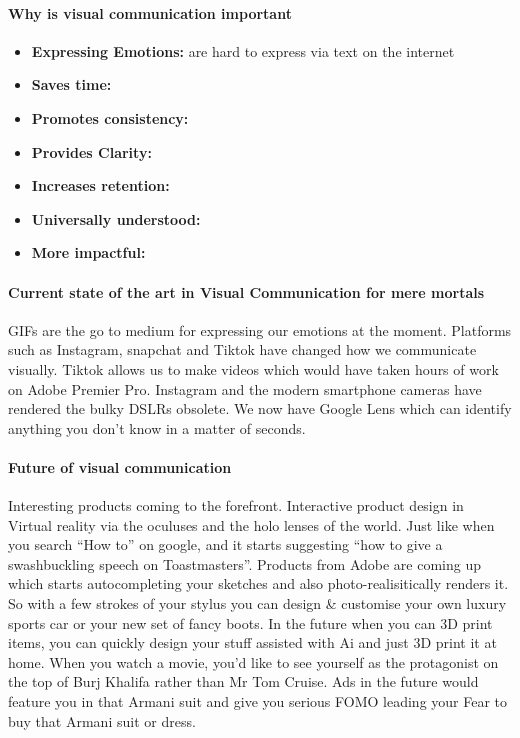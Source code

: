 \paragraph{Why is visual communication important}

\begin{itemize}
	\item \textbf{Expressing Emotions:} are hard to express via text on the internet
	
	\item \textbf{Saves time:}
	
	\item \textbf{Promotes consistency:}
	
	\item \textbf{Provides Clarity:}
	
	\item \textbf{Increases retention:}
	
	\item \textbf{Universally understood:}
	
	\item \textbf{More impactful:}
	
\end{itemize}


\paragraph{Current state of the art in Visual Communication for mere mortals}

GIFs are the go to medium for expressing our emotions at the moment. Platforms such as Instagram, snapchat and Tiktok have changed how we communicate visually. Tiktok allows us to make videos which would have taken hours of work on Adobe Premier Pro. Instagram and the modern smartphone cameras have rendered the bulky DSLRs obsolete. We now have Google Lens which can identify anything you don’t know in a matter of seconds. 

\paragraph{Future of visual communication}

Interesting products coming to the forefront. Interactive product design in Virtual reality via the oculuses and the holo lenses of the world. 
Just like when you search “How to” on google, and it starts suggesting “how to give a swashbuckling speech on Toastmasters”. Products from Adobe are coming up which starts autocompleting your sketches and also photo-realisitically renders it.
So with a few strokes of your stylus you can design \& customise  your own luxury sports car or your new set of fancy boots.
 In the future when you can 3D print items, you can quickly design your stuff assisted with Ai and just 3D print it at home. When you watch a movie, you’d like to see yourself as the protagonist on the top of Burj Khalifa rather than Mr Tom Cruise. Ads in the future would feature you in that Armani suit and give you serious FOMO leading your Fear to buy that Armani suit or dress.

